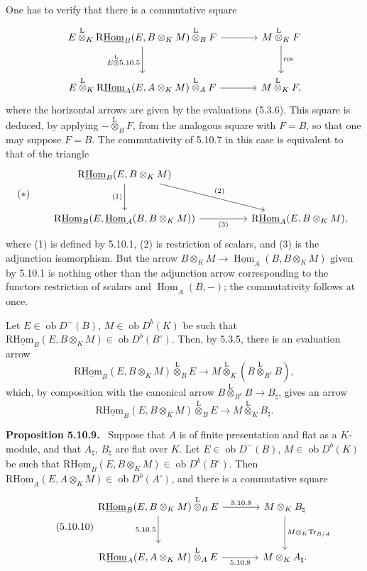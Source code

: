 \documentclass[11pt]{article}
\providecommand{\uHom}{\underline{\Hom}}
\newenvironment{statement}[1]{\par\medskip\noindent\textbf{#1.}\ }{\par\medskip}
\DeclareMathOperator{\Hom}{Hom}
\newcommand{\ob}{\operatorname{ob}}
\providecommand{\Tr}{\operatorname{Tr}}
\providecommand{\Tr}{\operatorname{Tr}}
\providecommand{\lten}{\overset{\mathrm L}{\otimes}}
\providecommand{\Tr}{\operatorname{Tr}}
\providecommand{\Hom}{\operatorname{Hom}}
\providecommand{\ob}{\operatorname{ob}}
\providecommand{\lten}{\overset{\mathrm L}{\otimes}}
\providecommand{\lten}{\overset{\mathrm L}{\otimes}}
\providecommand{\Tr}{\operatorname{Tr}}
\providecommand{\lten}{\overset{\mathrm L}{\otimes}}
\providecommand{\lten}{\overset{\mathrm L}{\otimes}}
\providecommand{\lten}{\overset{\mathrm L}{\otimes}}
\providecommand{\Hom}{\operatorname{Hom}}
\providecommand{\Tr}{\operatorname{Tr}}
\providecommand{\lten}{\overset{\mathrm L}{\otimes}}
\begin{document}
One has to verify that there is a commutative square
\[
\begin{tikzcd}[column sep=large,row sep=large]
E\lten_K\mathrm{R}\underline{\mathrm{Hom}}_B(E,B\otimes_KM)\lten_BF \arrow[r] \arrow[d,"E\lten 5.10.5"'] & M\lten_KF \arrow[d,"\mathrm{res}"]\\
E\lten_K\mathrm{R}\underline{\mathrm{Hom}}_A(E,A\otimes_KM)\lten_AF \arrow[r] & M\lten_KF,
\end{tikzcd}
\]
where the horizontal arrows are given by the evaluations (5.3.6). This square is deduced, by applying $-\lten_BF$, from the analogous square with $F=B$, so that one may suppose $F=B$. The commutativity of 5.10.7 in this case is equivalent to that of the triangle
\[
(*)\qquad
\begin{tikzcd}[column sep=huge,row sep=large]
\mathrm{R}\underline{\mathrm{Hom}}_B(E,B\otimes_KM) \arrow[d,"(1)"'] \arrow[dr,"(2)"] & \\
\mathrm{R}\underline{\mathrm{Hom}}_B(E,\uHom_A(B,B\otimes_KM)) \arrow[r,"(3)"'] & \mathrm{R}\underline{\mathrm{Hom}}_A(E,B\otimes_KM),
\end{tikzcd}
\]
where (1) is defined by 5.10.1, (2) is restriction of scalars, and (3) is the adjunction isomorphism. But the arrow $B\otimes_KM\to\uHom_A(B,B\otimes_KM)$ given by 5.10.1 is nothing other than the adjunction arrow corresponding to the functors restriction of scalars and $\uHom_A(B,-)$; the commutativity follows at once.

Let $E\in\ob D^-(B)$, $M\in\ob D^b(K)$ be such that $\mathrm{R}\underline{\mathrm{Hom}}_B(E,B\otimes_KM)\in\ob D^b(B^\circ)$. Then, by 5.3.5, there is an evaluation arrow
\[
\mathrm{R}\underline{\mathrm{Hom}}_B(E,B\otimes_KM)\lten_BE\longrightarrow M\lten_K(B\lten_{B^e}B),
\]
which, by composition with the canonical arrow $B\lten_{B^e}B\to B_\natural$, gives an arrow
\begin{equation}\tag{5.10.8}
\mathrm{R}\underline{\mathrm{Hom}}_B(E,B\otimes_KM)\lten_BE\longrightarrow M\lten_KB_\natural.
\end{equation}

\begin{statement}{Proposition 5.10.9}
Suppose that $A$ is of finite presentation and flat as a $K$-module, and that $A_\natural$, $B_\natural$ are flat over $K$. Let $E\in\ob D^-(B)$, $M\in\ob D^b(K)$ be such that $\mathrm{R}\underline{\mathrm{Hom}}_B(E,B\otimes_KM)\in\ob D^b(B^\circ)$. Then $\mathrm{R}\underline{\mathrm{Hom}}_A(E,A\otimes_KM)\in\ob D^b(A^\circ)$, and there is a commutative square
\begin{equation}\tag{5.10.10}
\begin{tikzcd}[column sep=large,row sep=large]
\mathrm{R}\underline{\mathrm{Hom}}_B(E,B\otimes_KM)\lten_BE \arrow[r,"5.10.8"] \arrow[d,"5.10.5"'] & M\otimes_KB_\natural \arrow[d,"M\otimes_K\Tr_{B/A}"]\\
\mathrm{R}\underline{\mathrm{Hom}}_A(E,A\otimes_KM)\lten_AE \arrow[r,"5.10.8"'] & M\otimes_KA_\natural .
\end{tikzcd}
\end{equation}
\end{statement}
\end{document}
